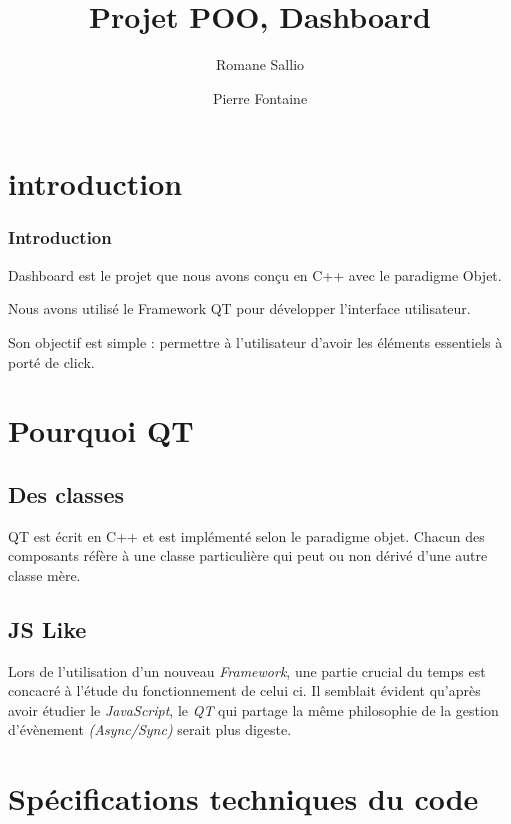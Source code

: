 \documentclass[10pt]{beamer}
\title{Projet POO, Dashboard}
\author{Romane Sallio \and Pierre Fontaine}
\institute{UPPA, Licence, Informatique}
\begin{document}
\begin{frame}
  \titlepage
\end{frame}

\begin{frame}
  \tableofcontents
\end{frame}

\section{introduction}

\begin{frame}
  \frametitle{Introduction}
  Dashboard est le projet que nous avons conçu en C++ avec le paradigme Objet.

  Nous avons utilisé le Framework QT pour développer l'interface utilisateur.

  Son objectif est simple : permettre à l'utilisateur d'avoir les éléments essentiels à porté de click.
\end{frame}

\section{Pourquoi QT}
\subsection{Des classes}
\begin{frame}
  QT est écrit en C++ et est implémenté selon le paradigme objet. Chacun des composants réfère à une classe particulière qui peut ou non dérivé d'une autre classe mère.
\end{frame}
  \subsection{JS Like}
    \begin{frame}
      Lors de l'utilisation d'un nouveau \emph{Framework}, une partie crucial du temps est concacré à l'étude du fonctionnement de celui ci. Il semblait évident qu'après avoir étudier le \emph{JavaScript}, le \emph{QT} qui partage la même philosophie de la gestion d'évènement \emph{(Async/Sync)} serait plus digeste.
    \end{frame}
\section{Spécifications techniques du code}
\end{document}
